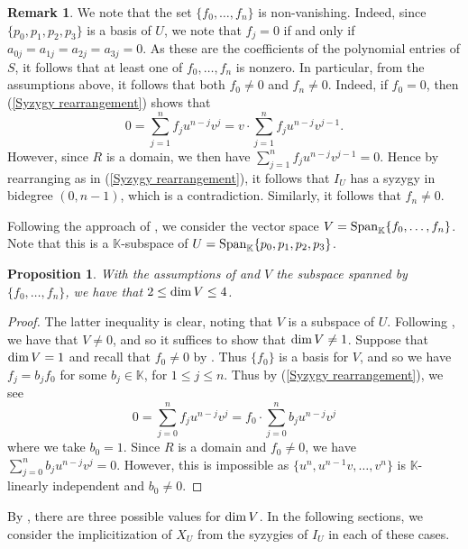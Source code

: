 \documentclass[reqno]{amsart}
\newtheorem{prop}[thm]{Proposition}
\numberwithin{equation}{section}
\theoremstyle{definition}
\newtheorem{rem}[thm]{Remark}
\def\K{\mathbb{K}}
\def\dim{\mathop{\rm dim}}
\def\Span{\mathop{\rm Span}}
\begin{document}
\begin{rem}\label{f0 and fn nonzero}
We note that the set $\{f_0,\ldots,f_n\}$ is non-vanishing. Indeed, since $\{p_0,p_1,p_2,p_3\}$ is a basis of $U$, we note that $f_j =0$ if and only if $a_{0j} = a_{1j} = a_{2j} = a_{3j}=0$. As these are the coefficients of the polynomial entries of $S$, it follows that at least one of $f_0,\ldots,f_n$ is nonzero. In particular, from the assumptions above, it follows that both $f_0 \neq 0$ and $f_n \neq 0$. Indeed, if $f_0 =0$, then (\ref{Syzygy rearrangement}) shows that 
$$0=\sum_{j=1}^n f_j u^{n-j}v^j = v\cdot\sum_{j=1}^n f_j u^{n-j}v^{j-1}.$$
However, since $R$ is a domain, we then have $\sum_{j=1}^n f_j u^{n-j}v^{j-1} =0$. Hence by rearranging as in (\ref{Syzygy rearrangement}), it follows that $I_U$ has a syzygy in bidegree $(0,n-1)$, which is a contradiction. Similarly, it follows that $f_n\neq 0$.
\end{rem}






Following the approach of \cite{Weaver25}, we consider the vector space $V = \Span_\K\{f_0,\ldots,f_n\}$. Note that this is a $\K$-subspace of $U =  \Span_\K\{p_0,p_1,p_2,p_3\}$. 







\begin{prop}\label{Dimension of V}
With the assumptions of  and $V$ the subspace spanned by $\{f_0,\ldots,f_n\}$, we have that $2\leq \dim V\leq 4$.
\end{prop}


\begin{proof}
The latter inequality is clear, noting that $V$ is a subspace of $U$. Following , we have that $V \neq 0$, and so it suffices to show that $\dim V \neq 1$. Suppose that $\dim V =1$ and recall that $f_0 \neq 0$ by . Thus $\{f_0\}$ is a basis for $V$, and so we have $f_j = b_jf_0$ for some $b_j \in \K$, for $1\leq j\leq n$. Thus by (\ref{Syzygy rearrangement}), we see
$$0=\sum_{j=0}^n f_j u^{n-j}v^j = f_0 \cdot \sum_{j=0}^n b_j u^{n-j}v^j$$
where we take $b_0 =1$. Since $R$ is a domain and $f_0 \neq 0$, we have $\sum_{j=0}^n b_j u^{n-j}v^j=0$. However, this is impossible as $\{u^n,u^{n-1}v,\ldots,v^n\}$ is $\K$-linearly independent and $b_0\neq 0$. 
\end{proof}


By , there are three possible values for $\dim V$. In the following sections, we consider the implicitization of $X_U$ from the syzygies of $I_U$ in each of these cases.
\end{document}
